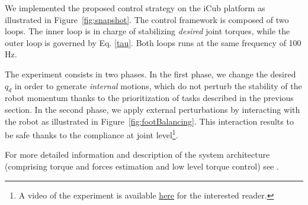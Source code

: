 \documentclass[final,5p,twocolumn]{elsarticle}
\begin{document}

We implemented the proposed control strategy on the iCub platform as illustrated in Figure~\ref{fig:snapshot}. The control framework is composed of two
loops. The inner loop is in charge of stabilizing \emph{desired} joint torques, while the outer loop is governed by 
Eq. \eqref{tau}. Both loops runs at the same frequency of 100 Hz. 

The experiment consists in two phases. In the first phase, we change the desired $q_d$ in order to generate 
\emph{internal} motions, which do not perturb the stability of the robot momentum thanks to the prioritization of tasks
described in the previous section. In the second phase, we apply external perturbations by interacting with the robot as illustrated in Figure~\ref{fig:footBalancing}. This 
interaction  results to be safe thanks to the compliance at joint level\footnote{A video of the experiment is available \href{https://www.youtube.com/watch?v=VrPBSSQEr3A}{here} for the interested reader.}.

For more detailed information and description of the system architecture (comprising torque and forces estimation and low level torque control) see \cite{noriFrontiers2015}.
\end{document}
